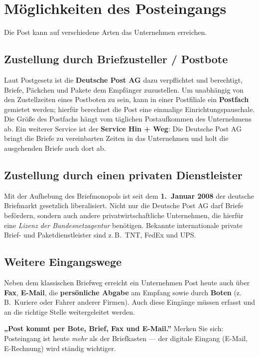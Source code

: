 \documentclass[11pt, a4paper]{article}
\begin{document}
\section{Möglichkeiten des Posteingangs}

Die Post kann auf verschiedene Arten das Unternehmen erreichen.

\subsection{Zustellung durch Briefzusteller / Postbote}

Laut Postgesetz ist die \textbf{Deutsche Post AG} dazu verpflichtet und berechtigt, Briefe,
Päckchen und Pakete dem Empfänger zuzustellen. Um unabhängig von den Zustellzeiten eines
Postboten zu sein, kann in einer Postfiliale ein \textbf{Postfach} gemietet werden; hierfür
berechnet die Post eine einmalige Einrichtungspauschale. Die Größe des Postfachs hängt vom
täglichen Postaufkommen des Unternehmens ab. Ein weiterer Service ist der \textbf{Service
Hin + Weg}: Die Deutsche Post AG bringt die Briefe zu vereinbarten Zeiten in das Unternehmen
und holt die ausgehenden Briefe auch dort ab.

\subsection{Zustellung durch einen privaten Dienstleister}

Mit der Aufhebung des Briefmonopols ist seit dem \textbf{1.\ Januar 2008} der deutsche
Briefmarkt gesetzlich liberalisiert. Nicht nur die Deutsche Post AG darf Briefe befördern,
sondern auch andere privatwirtschaftliche Unternehmen, die hierfür eine \emph{Lizenz der
Bundesnetzagentur} benötigen. Bekannte internationale private Brief- und Paketdienstleister
sind z.\,B.\ TNT, FedEx und UPS.

\subsection{Weitere Eingangswege}

Neben dem klassischen Briefweg erreicht ein Unternehmen Post heute auch über
\textbf{Fax}, \textbf{E-Mail}, die \textbf{persönliche Abgabe} am Empfang sowie durch
\textbf{Boten} (z.\,B.\ Kuriere oder Fahrer anderer Firmen). Auch diese Eingänge müssen erfasst
und an die richtige Stelle weitergeleitet werden.

\begin{eselsbruecke}
\textbf{„Post kommt per Bote, Brief, Fax und E-Mail.”} Merken Sie sich: Posteingang ist heute
\emph{mehr} als der Briefkasten --- der digitale Eingang (E-Mail, E-Rechnung) wird ständig
wichtiger.
\end{eselsbruecke}
\end{document}
